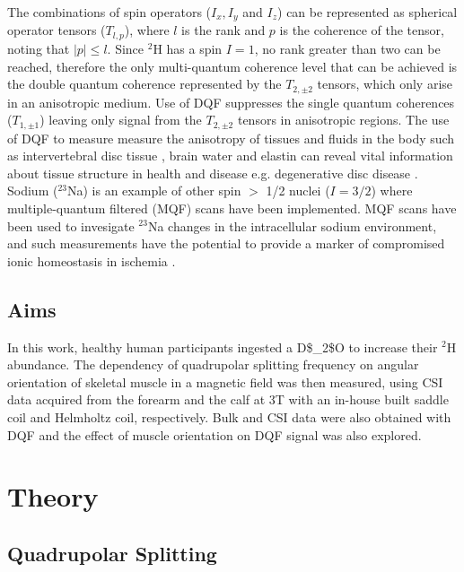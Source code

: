 The combinations of spin operators ($I_x, I_y$ and $I_z$) can be represented as spherical operator tensors ($T_{l,p}$), where $l$ is the rank and $p$ is the coherence of the tensor, noting that $|p| \le l$. Since $^2$H has a spin $I=1$, no rank greater than two can be reached, therefore the only multi-quantum coherence level that can be achieved is the double quantum coherence represented by the $T_{2,\pm2}$ tensors, which only arise in an anisotropic medium. Use of \ac{DQF} suppresses the single quantum coherences ($T_{1,\pm1}$) leaving only signal from the $T_{2,\pm2}$ tensors in anisotropic regions. The use of \ac{DQF} to measure measure the anisotropy of tissues and fluids in the body such as intervertebral disc tissue  \cite{Ooms2015DoubleTissue}, brain water \cite{Assaf1997InSpectroscopy} and elastin \cite{Sun2010InvestigationNMR} can reveal vital information about tissue structure in health and disease e.g. degenerative disc disease \cite{Ooms2015DoubleTissue}. Sodium ($^{23}$Na) is an example of other spin $>$ 1/2 nuclei ($I=3/2$) where multiple-quantum filtered (MQF) scans have been implemented. MQF scans have been used to invesigate $^{23}$Na changes in the intracellular sodium environment, and such measurements have the potential to provide a marker of compromised ionic homeostasis in ischemia \cite{Tsang2012Triple-quantum-filteredT}.

\subsection{Aims}

In this work, healthy human participants ingested a \ac{D$_2$O} to increase their $^2$H abundance. The dependency of quadrupolar splitting frequency on angular orientation of skeletal muscle in a magnetic field was then measured, using \ac{CSI} data acquired from the forearm and the calf at 3T with an in-house built saddle coil and Helmholtz coil, respectively. Bulk and \ac{CSI} data were also obtained with \ac{DQF} and the effect of muscle orientation on \ac{DQF} signal was also explored.

\section{Theory}
\subsection{Quadrupolar Splitting}


